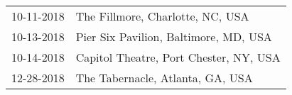 \begin{supertabular}{ll}
 10-11-2018 &        The Fillmore, Charlotte, NC, USA \\
 10-13-2018 &   Pier Six Pavilion, Baltimore, MD, USA \\
 10-14-2018 &  Capitol Theatre, Port Chester, NY, USA \\
 12-28-2018 &        The Tabernacle, Atlanta, GA, USA \\
\end{supertabular}
